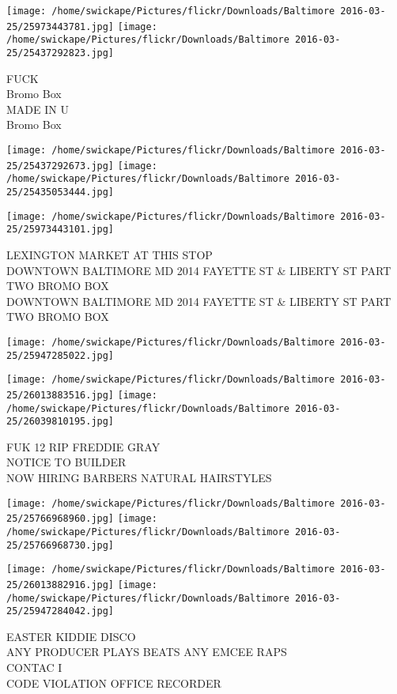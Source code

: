 \documentclass[10pt,letterpaper]{article}
\begin{document}
\texttt{[image: /home/swickape/Pictures/flickr/Downloads/Baltimore 2016-03-25/25973443781.jpg]}
\texttt{[image: /home/swickape/Pictures/flickr/Downloads/Baltimore 2016-03-25/25437292823.jpg]}

FUCK\\
Bromo Box\\
MADE IN U\\
Bromo Box\\
\pagebreak

\texttt{[image: /home/swickape/Pictures/flickr/Downloads/Baltimore 2016-03-25/25437292673.jpg]}
\texttt{[image: /home/swickape/Pictures/flickr/Downloads/Baltimore 2016-03-25/25435053444.jpg]}

\texttt{[image: /home/swickape/Pictures/flickr/Downloads/Baltimore 2016-03-25/25973443101.jpg]}

LEXINGTON MARKET AT THIS STOP\\
DOWNTOWN BALTIMORE MD 2014 FAYETTE ST \& LIBERTY ST PART TWO BROMO BOX\\
DOWNTOWN BALTIMORE MD 2014 FAYETTE ST \& LIBERTY ST PART TWO BROMO BOX\\
\pagebreak

\texttt{[image: /home/swickape/Pictures/flickr/Downloads/Baltimore 2016-03-25/25947285022.jpg]}

\vspace{0.25in}
\texttt{[image: /home/swickape/Pictures/flickr/Downloads/Baltimore 2016-03-25/26013883516.jpg]}
\texttt{[image: /home/swickape/Pictures/flickr/Downloads/Baltimore 2016-03-25/26039810195.jpg]}

FUK 12 RIP FREDDIE GRAY\\
NOTICE TO BUILDER\\
NOW HIRING BARBERS NATURAL HAIRSTYLES\\
\pagebreak

\texttt{[image: /home/swickape/Pictures/flickr/Downloads/Baltimore 2016-03-25/25766968960.jpg]}
\texttt{[image: /home/swickape/Pictures/flickr/Downloads/Baltimore 2016-03-25/25766968730.jpg]}

\texttt{[image: /home/swickape/Pictures/flickr/Downloads/Baltimore 2016-03-25/26013882916.jpg]}
\texttt{[image: /home/swickape/Pictures/flickr/Downloads/Baltimore 2016-03-25/25947284042.jpg]}

EASTER KIDDIE DISCO\\
ANY PRODUCER PLAYS BEATS ANY EMCEE RAPS\\
CONTAC I\\
CODE VIOLATION OFFICE RECORDER\\
\pagebreak
\end{document}
